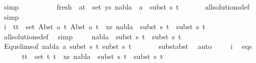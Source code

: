 \begin{isabellebody}
\ simp\isanewline
\isanewline
\ \ \ \isamarkupfalse%
\ {}\isanewline
\ \ \ \isamarkupfalse%
\ fresh{\isacharcolon}{\kern0pt}\ {\isachardoublequoteopen}{\isasymforall}\ {\isacharparenleft}{\kern0pt}a{\isacharcomma}{\kern0pt}t{\isacharparenright}{\kern0pt}\ {\isasymin}\ set\ ys{\isachardot}{\kern0pt}\ nabla{}\ {\isasymturnstile}\ a\ {\isasymsharp}\ subst\ s{}\ t{\isachardoublequoteclose}\isanewline
\ \ \ \ \ \isamarkupfalse%
\ all{\isacharunderscore}{\kern0pt}solutions{\isacharunderscore}{\kern0pt}def\ \isamarkupfalse%
\ simp\isanewline
\isanewline
\ \ \ \isamarkupfalse%
\ {}\isanewline
\ \ \ \isamarkupfalse%
\ i{\isacharcolon}{\kern0pt}\ {\isachardoublequoteopen}{\isasymforall}\ {\isacharparenleft}{\kern0pt}t{}{\isacharcomma}{\kern0pt}t{}{\isacharparenright}{\kern0pt}\ {\isasymin}\ set\ {\isacharparenleft}{\kern0pt}{\isacharparenleft}{\kern0pt}Abst\ a\ t{}{\isacharcomma}{\kern0pt}\ Abst\ a\ t{}{\isacharparenright}{\kern0pt}\ {\isacharhash}{\kern0pt}\ xs{\isacharparenright}{\kern0pt}{\isachardot}{\kern0pt}\ nabla{}\ {\isasymturnstile}\ subst\ s{}\ t{}\ {\isasymapprox}\ subst\ s{}\ t{}{\isachardoublequoteclose}\isanewline
\ \ \ \ \ \isamarkupfalse%
\ all{\isacharunderscore}{\kern0pt}solutions{\isacharunderscore}{\kern0pt}def\ \isamarkupfalse%
\ simp\isanewline
\ \ \ \isamarkupfalse%
\ {\isachardoublequoteopen}nabla{}\ {\isasymturnstile}\ subst\ s{}\ t{}\ {\isasymapprox}\ subst\ s{}\ t{}{\isachardoublequoteclose}\ \isanewline
\ \ \ \ \ \isamarkupfalse%
\ Equ{\isacharunderscore}{\kern0pt}elims{\isacharparenleft}{\kern0pt}{}{\isacharparenright}{\kern0pt}{\isacharbrackleft}{\kern0pt}of\ nabla{}\ a\ {\isacartoucheopen}subst\ s{}\ t{}{\isacartoucheclose}\ {\isacartoucheopen}subst\ s{}\ t{}{\isacartoucheclose}{\isacharbrackright}{\kern0pt}\ \isanewline
\ \ \ \ \ \ subst{\isacharunderscore}{\kern0pt}abst\ \isamarkupfalse%
\ auto\isanewline
\ \ \ \isamarkupfalse%
\ i\ \isamarkupfalse%
\ eqs{\isacharcolon}{\kern0pt}\ \isanewline
\ \ \ \ \ {\isachardoublequoteopen}{\isasymforall}\ {\isacharparenleft}{\kern0pt}t{}{\isacharcomma}{\kern0pt}t{}{\isacharparenright}{\kern0pt}\ {\isasymin}\ set\ {\isacharparenleft}{\kern0pt}{\isacharparenleft}{\kern0pt}t{}{\isacharcomma}{\kern0pt}\ t{}{\isacharparenright}{\kern0pt}\ {\isacharhash}{\kern0pt}\ xs{\isacharparenright}{\kern0pt}{\isachardot}{\kern0pt}\ nabla{}\ {\isasymturnstile}\ subst\ s{}\ t{}\ {\isasymapprox}\ subst\ s{}\ t{}{\isachardoublequoteclose}\isanewline

\end{isabellebody}
